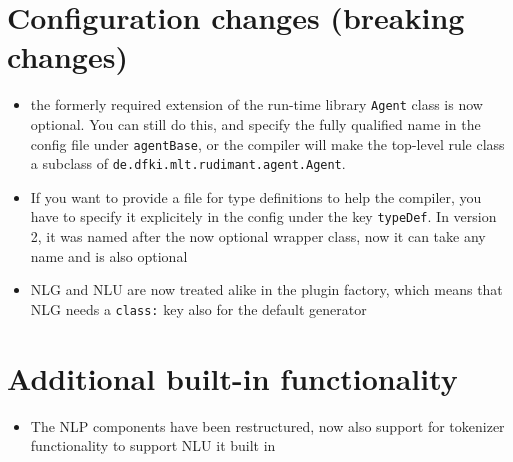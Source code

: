 \documentclass[a4paper]{report}
\begin{document}
\section*{Configuration changes (breaking changes)}
\begin{itemize}
\item the formerly required extension of the run-time library
  \texttt{Agent} class is now optional. You can still do this, and
  specify the fully qualified name in the config file under
  \texttt{agentBase}, or the compiler will make the top-level rule
  class a subclass of \texttt{de.dfki.mlt.rudimant.agent.Agent}.
\item If you want to provide a file for type definitions to help the
  compiler, you have to specify it explicitely in the config under the
  key \texttt{typeDef}. In version 2, it was named after the now
  optional wrapper class, now it can take any name and is also optional
\item NLG and NLU are now treated alike in the plugin factory, which
  means that NLG needs a \texttt{class:} key also for the default generator
\end{itemize}
\section*{Additional built-in functionality}
\begin{itemize}
\item The NLP components have been restructured, now also support for
  tokenizer functionality to support NLU it built in
\end{itemize}



\end{document}
